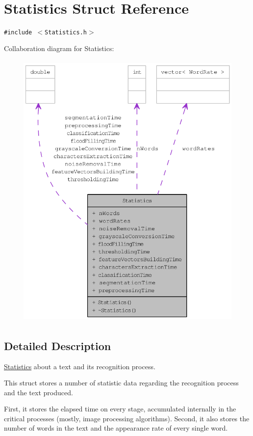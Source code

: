 \hypertarget{struct_statistics}{
\section{Statistics Struct Reference}
\label{struct_statistics}
}
{\tt \#include $<$Statistics.h$>$}

Collaboration diagram for Statistics:\nopagebreak
\begin{figure}[H]
\begin{center}
\leavevmode
\includegraphics[height=400pt]{struct_statistics__coll__graph}
\end{center}
\end{figure}


\subsection{Detailed Description}
\hyperlink{struct_statistics}{Statistics} about a text and its recognition process. 

This struct stores a number of statistic data regarding the recognition process and the text produced.

First, it stores the elapsed time on every stage, accumulated internally in the critical processes (mostly, image processing algorithms). Second, it also stores the number of words in the text and the appearance rate of every single word.

